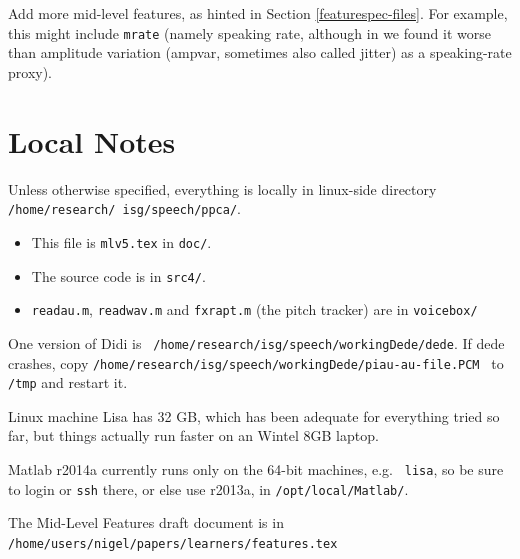 \documentclass[11pt]{article}
\begin{document}
Add more mid-level features, as hinted in Section
\ref{featurespec-files}.  For example, this might include {\tt mrate}
(namely speaking rate, although in \cite{timelm} we found it worse
than amplitude variation (ampvar, sometimes also called jitter) as a
speaking-rate proxy).

%


\section{Local Notes}

Unless otherwise specified, everything is
  locally in linux-side directory {\tt
    /home/research/ isg/speech/ppca/}.

\begin{itemize} \setlength{\itemsep}{0pt} \setlength{\parskip}{0pt}
\item   This file is {\tt mlv5.tex} in {\tt doc/}.
\item  The source code is in {\tt src4/}.
\item {\tt readau.m}, {\tt readwav.m} and {\tt fxrapt.m} (the pitch
  tracker) are in {\tt voicebox/}
\end{itemize}

One version of Didi is {\tt
  /home/research/isg/speech/workingDede/dede}.  If dede crashes, copy
{\tt /home/research/isg/speech/workingDede/piau-au-file.PCM } to {\tt
  /tmp} and restart it.

Linux machine Lisa has 32 GB, which has been adequate for everything
tried so far, but things actually run faster on an Wintel 8GB laptop.

Matlab r2014a currently runs only on the 64-bit machines, e.g. {\tt
  lisa}, so be sure to login or {\tt ssh} there, or else use r2013a,
in {\tt /opt/local/Matlab/}.

The Mid-Level Features draft document is in
{\tt /home/users/nigel/papers/learners/features.tex}




\end{document}
